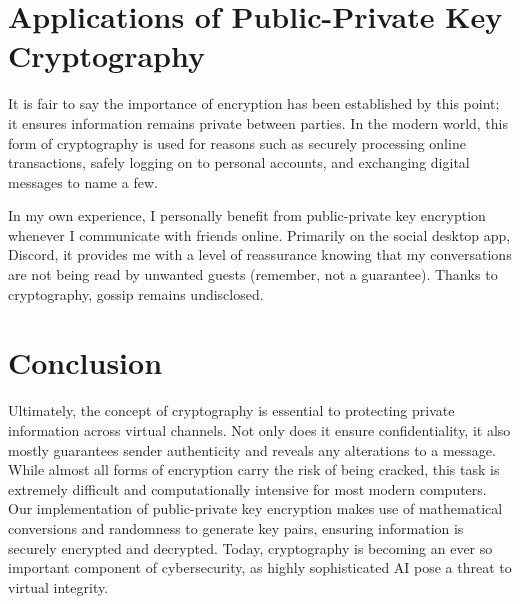 \documentclass[12pt]{article}
\begin{document}
\section{Applications of Public-Private Key Cryptography}

It is fair to say the importance of encryption has been established by this point; it ensures information remains private between parties. In the modern world, this form of cryptography is used for reasons such as securely processing online transactions, safely logging on to personal accounts, and exchanging digital messages to name a few.

\vspace{0.2in}

In my own experience, I personally benefit from public-private key encryption whenever I communicate with friends online. Primarily on the social desktop app, Discord, it provides me with a level of reassurance knowing that my conversations are not being read by unwanted guests (remember, not a guarantee). Thanks to cryptography, gossip remains undisclosed.

\section{Conclusion}

Ultimately, the concept of cryptography is essential to protecting private information across virtual channels. Not only does it ensure confidentiality, it also mostly guarantees sender authenticity and reveals any alterations to a message. While almost all forms of encryption carry the risk of being cracked, this task is extremely difficult and computationally intensive for most modern computers. Our implementation of public-private key encryption makes use of mathematical conversions and randomness to generate key pairs, ensuring information is securely encrypted and decrypted. Today, cryptography is becoming an ever so important component of cybersecurity, as highly sophisticated AI pose a threat to virtual integrity.
\end{document}
